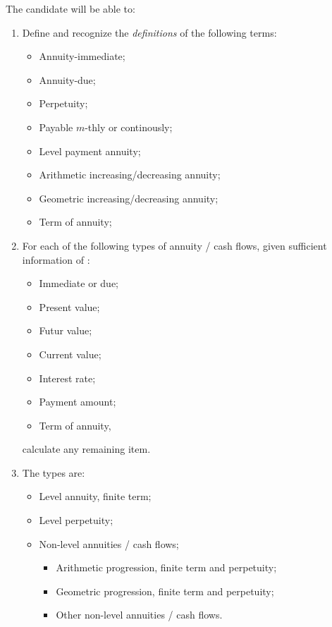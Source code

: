 \begin{outcomes}
The candidate will be able to:
\begin{enumerate}[label = \alph*), leftmargin = *]
	\item	Define and recognize the \textit{definitions} of the following terms:
		\begin{itemize}[leftmargin = *]
		\item	Annuity-immediate;
		\item	Annuity-due;
		\item	Perpetuity;
		\item	Payable $m$-thly or continously;
		\item	Level payment annuity;
		\item	Arithmetic increasing/decreasing annuity;
		\item	Geometric increasing/decreasing annuity;
		\item	Term of annuity;
		\end{itemize}
	\item	For each of the following types of annuity / cash flows, given sufficient information of :
		\begin{itemize}[leftmargin = *]
		\item	Immediate or due;
		\item	Present value;
		\item	Futur value;
		\item	Current value;
		\item	Interest rate;
		\item	Payment amount;
		\item	Term of annuity,
		\end{itemize}
		calculate any remaining item. 
	\item[]	The types are:
		\begin{itemize}[leftmargin = *]
		\item	Level annuity, finite term;
		\item	Level perpetuity;
		\item	Non-level annuities / cash flows;
			\begin{itemize}[leftmargin = *]
			\item	Arithmetic progression, finite term and perpetuity;
			\item	Geometric progression, finite term and perpetuity;
			\item	Other non-level annuities / cash flows.
			\end{itemize}
		\end{itemize}
\end{enumerate}
\end{outcomes}

